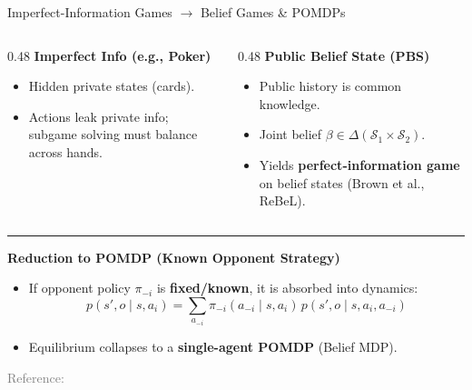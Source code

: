 \documentclass[18pt,aspectratio=149]{beamer}
\begin{document}
\begin{frame}{Imperfect-Information Games $\to$ Belief Games \& POMDPs}
    \begin{columns}[T,onlytextwidth]
        \begin{column}{0.48\textwidth}
            \textbf{Imperfect Info (e.g., Poker)}
            \begin{itemize}
                \item Hidden private states (cards).
                \item Actions leak private info; subgame solving must balance across hands.
            \end{itemize}
        \end{column}

        \begin{column}{0.48\textwidth}
            \textbf{Public Belief State (PBS)}
            \begin{itemize}
                \item Public history is common knowledge.
                \item Joint belief $\beta \in \Delta(\mathcal{S}_1 \times \mathcal{S}_2)$.
                \item Yields \textbf{perfect-information game} on belief states (Brown et al., ReBeL).
            \end{itemize}
        \end{column}
    \end{columns}

    \vspace{0.3em}
    \hrule
    \vspace{0.25em}

    \textbf{Reduction to POMDP (Known Opponent Strategy)}
    \begin{itemize}
        \item If opponent policy $\pi_{-i}$ is \textbf{fixed/known}, it is absorbed into dynamics:
        \vspace{-0.45em}
        \[
            p(s', o \mid s, a_i) = \sum_{a_{-i}} \pi_{-i}(a_{-i} \mid s, a_i) \, p(s', o \mid s, a_i, a_{-i})
        \]
        \vspace{-0.65em}
        \item Equilibrium collapses to a \textbf{single-agent POMDP} (Belief MDP).
    \end{itemize}

    \vspace{0.1em}
    {\tiny \textcolor{gray}{Reference: \cite{london_machine_learning_meetup_noam_2021}}}
\end{frame}
\end{document}
